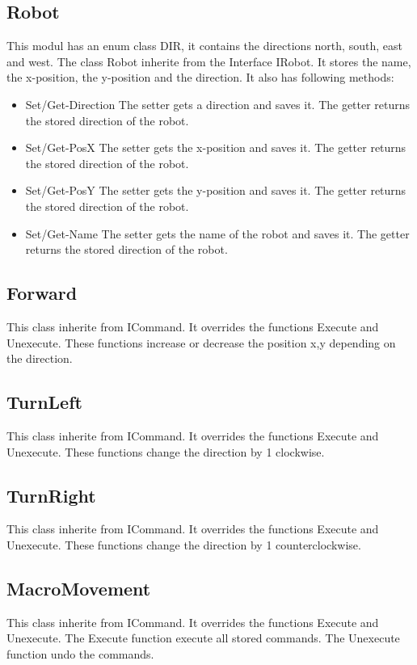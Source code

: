 \subsection{Robot}
This modul has an enum class DIR, it contains the directions north, south, east and west.
The class Robot inherite from the Interface IRobot. It stores the name, the x-position, the y-position and the direction.
It also has following methods:
\begin{itemize}
	\item Set/Get-Direction
	\subitem The setter gets a direction and saves it. The getter returns the stored direction of the robot.
	\item Set/Get-PosX
	\subitem The setter gets the x-position and saves it. The getter returns the stored direction of the robot.
	\item Set/Get-PosY
	\subitem The setter gets the y-position and saves it. The getter returns the stored direction of the robot.
	\item Set/Get-Name
	\subitem The setter gets the name of the robot and saves it. The getter returns the stored direction of the robot.
\end{itemize}

\subsection{Forward}
This class inherite from ICommand.
It overrides the functions Execute and Unexecute.  These functions increase or decrease the position x,y depending on the direction.

\subsection{TurnLeft}
This class inherite from ICommand.
It overrides the functions Execute and Unexecute.  These functions change the direction by 1 clockwise.

\subsection{TurnRight}
This class inherite from ICommand.
It overrides the functions Execute and Unexecute.  These functions change the direction by 1 counterclockwise.

\subsection{MacroMovement}
This class inherite from ICommand.
It overrides the functions Execute and Unexecute. 
The Execute function execute all stored commands.
The Unexecute function undo the commands.

